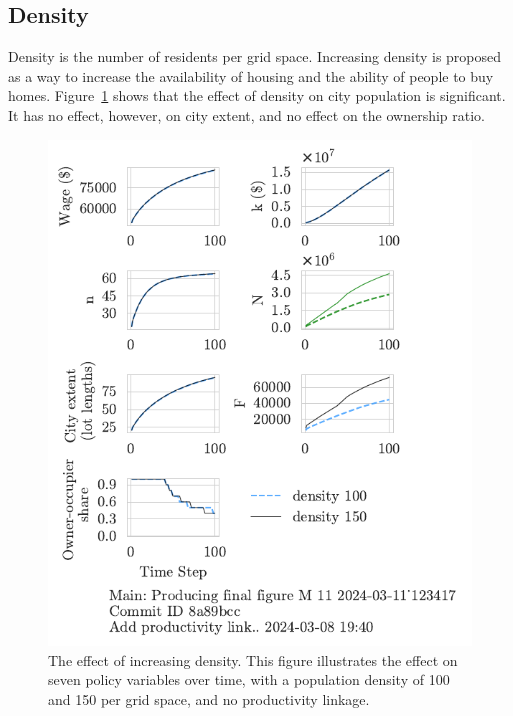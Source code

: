 

\newpage


\subsection{Density}
Density is the number of residents per grid space. Increasing density is proposed as a way to increase the availability of housing and the ability of people to buy homes. Figure~\ref{fig:density_ownership_trajectory} shows that the effect of density on city population is significant. It has no effect, however, on city extent, and no effect on the ownership ratio.


\begin{figure}[h!bt]
\centering
\includegraphics[scale=0.9, trim={0 1.4cm 0 0},clip]{fig/density-Main-123417.pdf}
\caption[The effect of increasing density]{The effect of increasing density. This figure illustrates the effect on seven policy variables over time, with a population density of 100 and 150 per grid space, and no productivity linkage.}
\label{fig:density_ownership_trajectory}
\end{figure}

